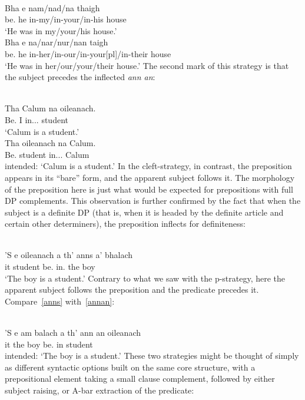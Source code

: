 \documentclass[output=paper]{langsci/langscibook}
\begin{document}
\ea {}\\
\gll Bha e nam/nad/na thaigh\\
be.\Pst{} he in-my/in-your/in-his house\\
\glt `He was in my/your/his house.'
\ex {}\\
\gll Bha e na/nar/nur/nan taigh\\
be.\Pst{} he in-her/in-our/in-your[pl]/in-their house\\
\glt `He was in her/our/your/their house.'
\z
The second mark of this strategy is that the subject precedes the inflected
\emph{ann an}:\largerpage

\ea {}\\
\gll Tha  Calum  na  oileanach.\\
Be.\Prs{}  I  in.\Poss.\Tsg.\M{}  student \\
\glt \enquote*{Calum is a student.}
\ex {}\\
\gll * Tha  oileanach  na  Calum.\\
    {} Be.\Prs{}  student  in.\Poss.\Tsg.\M{}  Calum \\
\glt {} intended: `Calum is a student.'
\z
In the cleft-strategy, in contrast, the preposition appears in its ``bare''
form, and the apparent subject follows it. The morphology of the preposition
here is just what would be expected for prepositions with full DP complements.
This observation is further confirmed by the fact that when the subject is a
definite DP (that is, when it is headed by the definite article and certain
other determiners), the preposition inflects for definiteness:

\ea {} \label{anns}\\
\gll 'S e oileanach a th' anns a' bhalach\\
\Cop{} it student \Rel{} be.\Prs{} in.\Def{} the  boy\\
\glt \enquote*{The boy is a student.}
\z
Contrary to what we saw with the p-strategy, here the apparent subject follows
the preposition and the predicate precedes it. Compare~\eqref{anns}
with~\eqref{annan}:

\ea {}\\
    \gll * 'S e am balach a th' {ann an} oileanach\\
         {} \Cop{} it the boy \Rel{} be.\Prs{} in student\\
    \glt {} intended: `The boy is a student.'\label{annan}
\z
These two strategies might be thought of simply as different syntactic options
built on the same core structure, with a prepositional element taking a small
clause complement, followed by either subject raising, or A-bar extraction of
the predicate:
\end{document}
